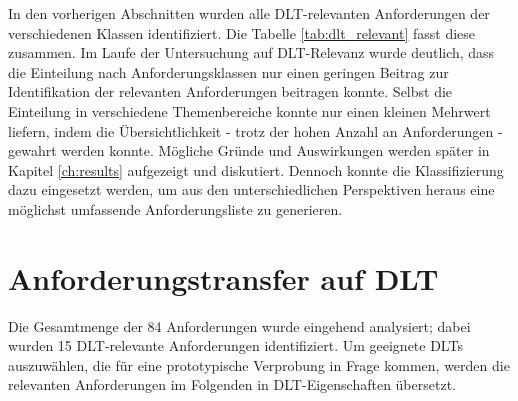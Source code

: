 In den vorherigen Abschnitten wurden alle \ac{DLT}-relevanten Anforderungen der verschiedenen Klassen identifiziert. Die Tabelle \ref{tab:dlt_relevant} fasst diese zusammen. Im Laufe der Untersuchung auf \ac{DLT}-Relevanz wurde deutlich, dass die Einteilung nach Anforderungsklassen nur einen geringen Beitrag zur Identifikation der relevanten Anforderungen beitragen konnte. Selbst die Einteilung in verschiedene Themenbereiche konnte nur einen kleinen Mehrwert liefern, indem die Übersichtlichkeit - trotz der hohen Anzahl an Anforderungen - gewahrt werden konnte. Mögliche Gründe und Auswirkungen werden später in Kapitel \ref{ch:results} aufgezeigt und diskutiert. Dennoch konnte die Klassifizierung dazu eingesetzt werden, um aus den unterschiedlichen Perspektiven heraus eine möglichst umfassende Anforderungsliste zu generieren.


%
%
\section{Anforderungstransfer auf DLT}
\label{sec:requirements:transfer}
Die Gesamtmenge der 84 Anforderungen wurde eingehend analysiert; dabei wurden 15 \ac{DLT}-relevante Anforderungen identifiziert. Um geeignete \ac{DLT}s auszuwählen, die für eine prototypische Verprobung in Frage kommen, werden die relevanten Anforderungen im Folgenden in \ac{DLT}-Eigenschaften übersetzt.

